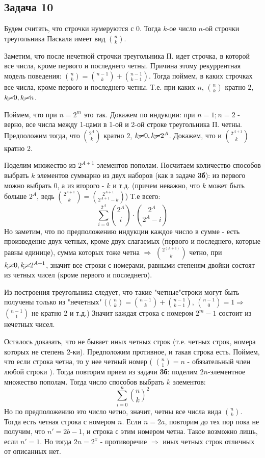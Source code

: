 \documentclass{article}
\begin{document}
 
 
 \begin{center}
 	\subsection*{Задача 10}
 \end{center}
	 Будем считать, что строчки нумеруются с $0$.
 Тогда $k$-ое число $n$-ой строчки треугольника Паскаля имеет вид ${n \choose k}$.
 
 Заметим, что после нечетной строчки треугольника П. идет строчка, в которой все числа, кроме первого и последнего четны. Причина этому рекуррентная модель поведения: ${n \choose k} = {n - 1 \choose k} + {n - 1 \choose k - 1}$.
 Тогда поймем, в каких строчках все числа, кроме первого и последнего четны. Т.е. при каких $n$, ${n \choose k}$ кратно $2$, $k \cancel{=} 0, k \cancel{=}n$.
 
 
 Поймем, что при $n = 2^m$ это так. Докажем по индукции: при $n = 1; n = 2$ - верно, все числа между 1-цами в 1-ой и 2-ой строке треугольника П. четны. 
 Предположим тогда, что ${2^A \choose k}$ кратно $2$, $k \cancel{=} 0, k \cancel{=}2^A$. Докажем, что и ${2^{A + 1} \choose k}$ кратно 2.
 
 Поделим множество из $2^{A + 1}$ элементов пополам. Посчитаем количество способов выбрать $k$ элементов суммарно из двух наборов (как в задаче \textbf{3б}): из первого можно выбрать 0, а из второго - $k$ и т.д. (причем неважно, что $k$ может быть больше $2^A$, ведь ${2^{A + 1} \choose k} = {2^{A + 1} \choose 2^{A + 1} - k}$) Т.е всего:
 $$ \sum_{i=0}^{2 ^ A} {2^A \choose i} \cdot {2^A \choose 2^A - i}$$
 Но заметим, что по предположению индукции каждое число в сумме - есть произведение двух четных, кроме двух слагаемых (первого и последнего, которые равны единице), сумма которых тоже четна $\Rightarrow$ ${2^(A+1) \choose k}$ четно, при $k \cancel{=} 0, k\cancel{=}2^{A+1}$, значит все строки с номерами, равными степеням двойки состоят из четных чисел (кроме первого и последнего).
 
 Из построения треугольника следует, что такие "четные"\space строки могут быть получены только из "нечетных" (${n \choose k} = {n - 1 \choose k} + {n - 1 \choose k - 1}$, ${n - 1 \choose 0} = 1 \Rightarrow $ ${n - 1 \choose 1}$ не кратно 2 и т.д.) Значит каждая строка с номером $2^m - 1$ состоит из нечетных чисел.
 
 Осталось доказать, что не бывает иных четных строк (т.е. четных строк, номера которых не степень 2-ки). Предположим противное, и такая строка есть. Поймем, что если строка четна, то у нее четный номер ( ${n \choose 1} = n $ - обязательный член любой строки ). Тогда повторим прием из задачи \textbf{3б}: поделим $2n$-элементное множество пополам. Тогда число способов выбрать $k$ элементов:
			 $$\sum_{i=0}^{n} {n \choose k}^2$$
 Но по предположению это число четно, значит, четны все числа вида  $ {n \choose k} $. Тогда есть четная строка с номером $n$. Если $n=2a$, повторим до тех пор пока не получим, что $n' = 2b - 1$, и строка с этим номером четна. Такое возможно лишь, если $n' = 1$. Но тогда $2n = 2^x$ - противоречие $\Rightarrow$ иных четных строк отличных от описанных нет.
 
\end{document}
